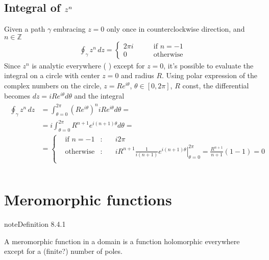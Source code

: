 \documentclass[letterpaper,10pt,english]{jupyterBook}
\begin{document}
\subsection{Integral of \protect\(z^n\protect\)}
\label{\detokenize{ch/complex/analysis:integral-of-z-n}}\label{\detokenize{ch/complex/analysis:complex-analysis-useful-int-path-independence-z-n}}
\sphinxAtStartPar
Given a path \(\gamma\) embracing \(z=0\) only once in counter\sphinxhyphen{}clockwise direction, and \(n \in \mathbb{Z}\)
\begin{equation*}
\begin{split}\oint_{\gamma} z^n \, dz = \left\{ \begin{aligned}  2 \pi i & \qquad \text{if $n = -1$} \\ 0 & \qquad \text{otherwise} \end{aligned} \right.\end{split}
\end{equation*}
\sphinxAtStartPar
Since \(z^n\) is analytic everywhere ( ) except for \(z=0\), it’s possible to evaluate the integral on a circle with center \(z=0\) and radius \(R\). Using polar expression of the complex numbers on the circle, \(z = R e^{i \theta}\), \(\theta \in [0, 2 \pi]\), \(R\) const, the differential becomes \(dz = i R e^{i \theta} d \theta\) and the integral
\begin{equation*}
\begin{split}\begin{aligned}
\oint_{\gamma} z^n \, dz
  & = \int_{\theta=0}^{2 \pi} \left( R e^{i\theta}\right)^n i R e^{i \theta} d \theta = \\
  & = i \int_{\theta=0}^{2 \pi} R^{n+1} e^{i (n+1) \theta} d \theta = \\
  & = \left\{ \begin{aligned}
    & \text{if $n=-1$} & : & \quad  i 2 \pi \\
    & \text{otherwise} & : & \quad  i R^{n+1} \frac{1}{i(n+1)} \left.e^{i(n+1)\theta}\right|_{\theta=0}^{2\pi} = \frac{R^{n+1}}{n+1} ( 1 - 1 ) = 0 \\
  \end{aligned} \right.\\
\end{aligned}\end{split}
\end{equation*}

\section{Meromorphic functions}
\label{\detokenize{ch/complex/analysis:meromorphic-functions}}\label{\detokenize{ch/complex/analysis:complex-analysis-mero-fun}}\label{ch/complex/analysis:definition-1}
\begin{sphinxadmonition}{note}{Definition 8.4.1}



\sphinxAtStartPar
A meromorphic function in a domain is a function holomorphic everywhere except for a (finite?) number of poles. 
\end{sphinxadmonition}
\end{document}
